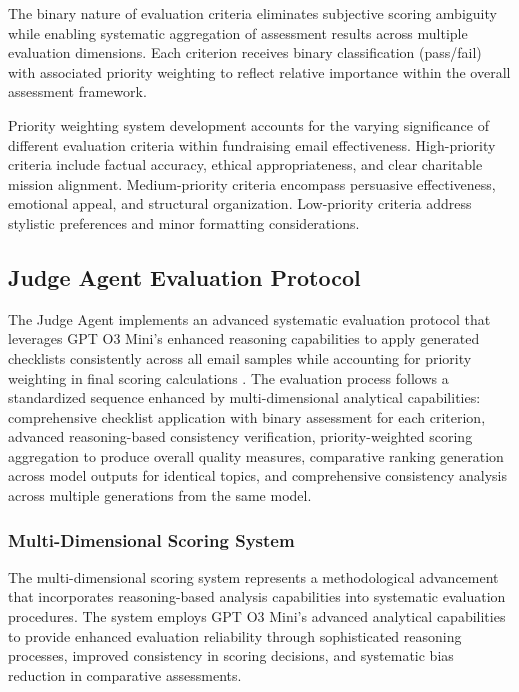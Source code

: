 The binary nature of evaluation criteria eliminates subjective scoring ambiguity while enabling systematic aggregation of assessment results across multiple evaluation dimensions. Each criterion receives binary classification (pass/fail) with associated priority weighting to reflect relative importance within the overall assessment framework.

Priority weighting system development accounts for the varying significance of different evaluation criteria within fundraising email effectiveness. High-priority criteria include factual accuracy, ethical appropriateness, and clear charitable mission alignment. Medium-priority criteria encompass persuasive effectiveness, emotional appeal, and structural organization. Low-priority criteria address stylistic preferences and minor formatting considerations.

\subsection{Judge Agent Evaluation Protocol}

The Judge Agent implements an advanced systematic evaluation protocol that leverages GPT O3 Mini's enhanced reasoning capabilities to apply generated checklists consistently across all email samples while accounting for priority weighting in final scoring calculations \cite{marjanovic2025deepseek_thoughtology, sui2025stop_overthinking}. The evaluation process follows a standardized sequence enhanced by multi-dimensional analytical capabilities: comprehensive checklist application with binary assessment for each criterion, advanced reasoning-based consistency verification, priority-weighted scoring aggregation to produce overall quality measures, comparative ranking generation across model outputs for identical topics, and comprehensive consistency analysis across multiple generations from the same model.

\subsubsection{Multi-Dimensional Scoring System}

The multi-dimensional scoring system represents a methodological advancement that incorporates reasoning-based analysis capabilities into systematic evaluation procedures. The system employs GPT O3 Mini's advanced analytical capabilities to provide enhanced evaluation reliability through sophisticated reasoning processes, improved consistency in scoring decisions, and systematic bias reduction in comparative assessments.

